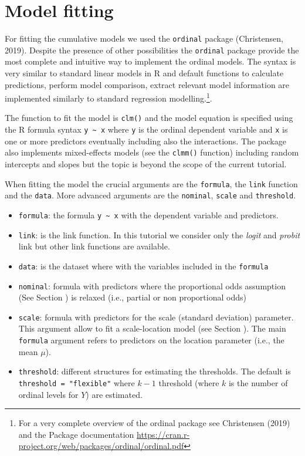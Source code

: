\documentclass[
  man,floatsintext]{apa6}
\providecommand{\tightlist}{%
  \setlength{\itemsep}{0pt}\setlength{\parskip}{0pt}}
\begin{document}
\section{Model fitting}\label{model-fitting}

For fitting the cumulative models we used the \texttt{ordinal} package (Christensen, 2019). Despite the presence of other possibilities the \texttt{ordinal} package provide the most complete and intuitive way to implement the ordinal models. The syntax is very similar to standard linear models in R and default functions to calculate predictions, perform model comparison, extract relevant model information are implemented similarly to standard regression modelling.\footnote{For a very complete overview of the ordinal package see Christensen (2019) and the Package documentation \url{https://cran.r-project.org/web/packages/ordinal/ordinal.pdf}}.

The function to fit the model is \texttt{clm()} and the model equation is specified using the R formula syntax \texttt{y\ \textasciitilde{}\ x} where \texttt{y} is the ordinal dependent variable and \texttt{x} is one or more predictors eventually including also the interactions. The package also implements mixed-effects models (see the \texttt{clmm()} function) including random intercepts and slopes but the topic is beyond the scope of the current tutorial.

When fitting the model the crucial arguments are the \texttt{formula}, the \texttt{link} function and the \texttt{data}. More advanced arguments are the \texttt{nominal}, \texttt{scale} and \texttt{threshold}.

\begin{itemize}
\tightlist
\item
  \texttt{formula}: the formula \texttt{y\ \textasciitilde{}\ x} with the dependent variable and predictors.
\item
  \texttt{link}: is the link function. In this tutorial we consider only the \emph{logit} and \emph{probit} link but other link functions are available.
\item
  \texttt{data}: is the dataset where with the variables included in the \texttt{formula}
\item
  \texttt{nominal}: formula with predictors where the proportional odds assumption (See Section ) is relaxed (i.e., partial or non proportional odds)
\item
  \texttt{scale}: formula with predictors for the scale (standard deviation) parameter. This argument allow to fit a scale-location model (see Section ). The main \texttt{formula} argument refers to predictors on the location parameter (i.e., the mean \(\mu\)).
\item
  \texttt{threshold}: different structures for estimating the thresholds. The default is \texttt{threshold\ =\ "flexible"} where \(k - 1\) threshold (where \(k\) is the number of ordinal levels for \(Y\)) are estimated.
\end{itemize}
\end{document}
